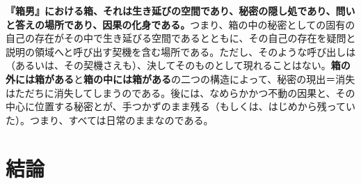 \documentclass[b5j,twoside,twocolumn]{utarticle}
\begin{document}
\textbf{『箱男』における箱、それは生き延びの空間であり、秘密の隠し処であり、問いと答えの場所であり、因果の化身である。}つまり、箱の中の秘密としての固有の自己の存在がその中で生き延びる空間であるとともに、その自己の存在を疑問と説明の領域へと呼び出す契機を含む場所である。ただし、そのような呼び出しは（あるいは、その契機さえも）、決してそのものとして現れることはない。\textbf{箱の外には箱がある}と\textbf{箱の中には箱がある}の二つの構造によって、秘密の現出＝消失はただちに消失してしまうのである。後には、なめらかかつ不動の因果と、その中心に位置する秘密とが、手つかずのまま残る（もしくは、はじめから残っていた）。つまり、すべては日常のままなのである。

\section{結論}
\end{document}
